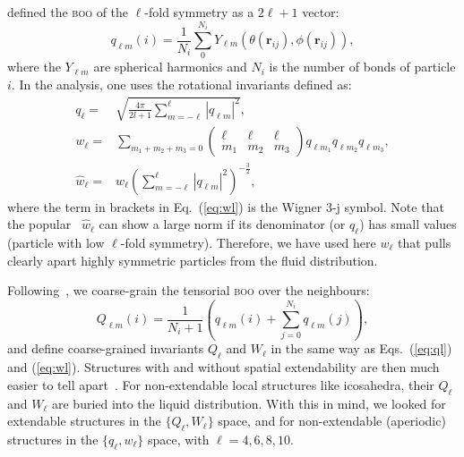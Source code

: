 \citet{steinhardt1983boo} defined the \textsc{boo} of the $\ell$-fold symmetry as a $2\ell+1$ vector:
\begin{equation}
	q_{\ell m}(i) = \frac{1}{N_i}\sum_{0}^{N_i} Y_{\ell m}(\theta(\mathbf{r}_{ij}),\phi(\mathbf{r}_{ij})),
	\label{eq:qlm}
\end{equation}
where the $Y_{\ell m}$ are spherical harmonics and $N_i$ is the number of bonds of particle $i$. In the analysis, one uses the rotational invariants defined as:
\begin{align}
	q_\ell =& \sqrt{\frac{4\pi}{2l+1} \sum_{m=-\ell}^{\ell} |q_{\ell m}|^2 }, \label{eq:ql}\\
	w_\ell =& \sum_{m_1+m_2+m_3=0} 
			\left( \begin{array}{ccc}
				\ell & \ell & \ell \\
				m_1 & m_2 & m_3 
			\end{array} \right)
			q_{\ell m_1} q_{\ell m_2} q_{\ell m_3}, \label{eq:wl}\\
	\hat{w}_\ell =& w_\ell{\left( \sum_{m=-\ell}^{\ell} |q_{\ell m}|^2 \right)}^{-\frac{3}{2}},
\end{align}
where the term in brackets in Eq.~(\ref{eq:wl}) is the Wigner 3-j symbol. Note that the popular~\citep{steinhardt1983boo,Lechner2008} $\hat{w}_\ell$ can show a large norm if its denominator (or $q_\ell$) has small values (particle with low $\ell$-fold symmetry). Therefore, we have used here $w_\ell$ that pulls clearly apart highly symmetric particles from the fluid distribution.

Following~\citet{Lechner2008}, we coarse-grain the tensorial \textsc{boo} over the neighbours:
\begin{equation}
	Q_{\ell m}(i) = \frac{1}{N_i+1}\left( q_{\ell m}(i) +  \sum_{j=0}^{N_i} q_{\ell m}(j)\right), 
	\label{eq:Qlm}
\end{equation}
and define coarse-grained invariants $Q_\ell$ and $W_\ell$ in the same way as Eqs.~(\ref{eq:ql}) and (\ref{eq:wl}). Structures with and without spatial extendability are then much easier to tell apart~\citep{Lechner2008}. For non-extendable local structures like icosahedra, their $Q_\ell$ and $W_\ell$ are buried into the liquid distribution. With this in mind, we looked for extendable structures in the $\lbrace Q_\ell, W_\ell\rbrace$ space, and for non-extendable (aperiodic) structures in the $\lbrace q_\ell, w_\ell\rbrace$ space, with $\ell=4,6,8,10$.

